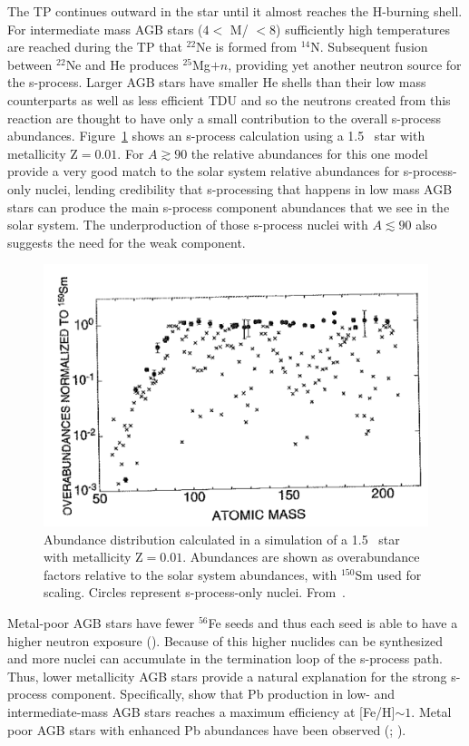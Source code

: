 The TP continues outward in the star until it almost reaches the
H-burning shell.  For intermediate mass  AGB stars ($4<$ M/\Msol
$< 8$) sufficiently high temperatures are reached during the TP that 
 $^{22}$Ne is formed from $^{14}$N.  Subsequent fusion
between $^{22}$Ne and He produces $^{25}$Mg$+n$, providing yet another
neutron source for the s-process.  Larger AGB stars have smaller He
shells than their low mass counterparts as well as less efficient TDU
and so the neutrons created from this reaction are thought to have
only a small contribution to the overall s-process abundances.
Figure~\ref{fig:sproc} shows an s-process calculation using a 1.5
\Msol\ star with metallicity Z$=0.01$. For $A\gtrsim90$ the
relative abundances for this one model provide a very good match to
the solar system relative abundances for s-process-only nuclei,
lending credibility that s-processing that happens in low mass AGB
stars can produce the main s-process component abundances that we see
in the solar system.  The underproduction of those s-process nuclei
with $A\lesssim90$ also suggests the need for the weak component.
\begin{figure}
\includegraphics[width=\linewidth]{pdf/sproc.png}
\caption{\label{fig:sproc} Abundance distribution calculated in a
  simulation of a 1.5 \Msol\ star with metallicity Z$=0.01$.
  Abundances are shown as overabundance factors relative to the solar
  system abundances, with $^{150}$Sm used for scaling.  Circles
  represent s-process-only nuclei.  From~\cite{arlandinietal1999}.}
\end{figure}

Metal-poor AGB stars have fewer $^{56}$Fe seeds and thus each seed is
able to have a higher neutron exposure (\citealt{gallinoetal1998}).
Because of this higher nuclides can be synthesized and more nuclei can
accumulate in the termination loop of the s-process path.  Thus, lower
metallicity AGB stars provide a natural explanation for the strong
s-process component.  Specifically, \cite{travaglioetal2001} show that 
Pb production
in low- and intermediate-mass AGB stars reaches a maximum efficiency
at [Fe/H]$\sim 1$.  Metal poor AGB stars with enhanced Pb abundances
have been observed (\citealt{vaneck2001}; \citealt{vanecketal2003}).

